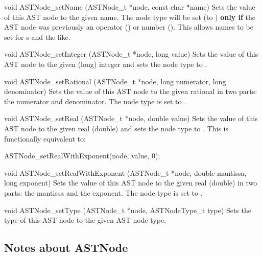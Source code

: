 \documentclass{sbmlmanual}
\begin{document}
\begin{methoddef}{void ASTNode\_setName (ASTNode\_t *node, const char *name)}
  Sets the value of this AST node to the given name.
  The node type will be set (to ) \textbf{only if} the AST
  node was previously an operator () or
  number ().  This allows names to be set for
  s and the like.
\end{methoddef}


\begin{methoddef}{void ASTNode\_setInteger (ASTNode\_t *node, long value)}
  Sets the value of this AST node to the given (long) integer and sets the
  node type to .
\end{methoddef}


\begin{methoddef}{void ASTNode\_setRational (ASTNode\_t *node, long numerator, long denominator)}
  Sets the value of this AST node to the given rational in two parts:
  the numerator and denominator.  The node type is set to .
\end{methoddef}


\begin{methoddef}{void ASTNode\_setReal (ASTNode\_t *node, double value)}
  Sets the value of this AST node to the given real (double) and sets the
  node type to .  This is functionally equivalent to:
  \begin{cVerbatim}
    ASTNode_setRealWithExponent(node, value, 0);
  \end{cVerbatim}
\end{methoddef}


\begin{methoddef}{void ASTNode\_setRealWithExponent (ASTNode\_t *node, double mantissa, long exponent)}
  Sets the value of this AST node to the given real (double) in two parts:
  the mantissa and the exponent.  The node type is set to
  .
\end{methoddef}


\begin{methoddef}{void ASTNode\_setType (ASTNode\_t *node, ASTNodeType\_t type)}
  Sets the type of this AST node to the given AST node type.
\end{methoddef}


\subsection{Notes about ASTNode}
\end{document}
